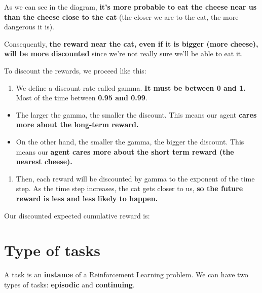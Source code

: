 \documentclass[11pt,a4paper]{article}
\begin{document}

As we can see in the diagram, \textbf{it's more probable to eat the cheese near us than the cheese close to the cat} (the closer we are to the cat, the more dangerous it is).

Consequently, \textbf{the reward near the cat, even if it is bigger (more cheese), will be more discounted} since we're not really sure we'll be able to eat it.

To discount the rewards, we proceed like this:

\begin{enumerate}
\def\labelenumi{\arabic{enumi}.}
\tightlist
\item
  We define a discount rate called gamma. \textbf{It must be between 0 and 1.} Most of the time between \textbf{0.95 and 0.99}.
\end{enumerate}

\begin{itemize}
\tightlist
\item
  The larger the gamma, the smaller the discount. This means our agent \textbf{cares more about the long-term reward.}
\item
  On the other hand, the smaller the gamma, the bigger the discount. This means our \textbf{agent cares more about the short term reward (the nearest cheese).}
\end{itemize}

\begin{enumerate}
\def\labelenumi{\arabic{enumi}.}
\setcounter{enumi}{1}
\tightlist
\item
  Then, each reward will be discounted by gamma to the exponent of the time step. As the time step increases, the cat gets closer to us, \textbf{so the future reward is less and less likely to happen.}
\end{enumerate}

Our discounted expected cumulative reward is:


\section{Type of tasks}\label{type-of-tasks}

A task is an \textbf{instance} of a Reinforcement Learning problem. We can have two types of tasks: \textbf{episodic} and \textbf{continuing}.
\end{document}

